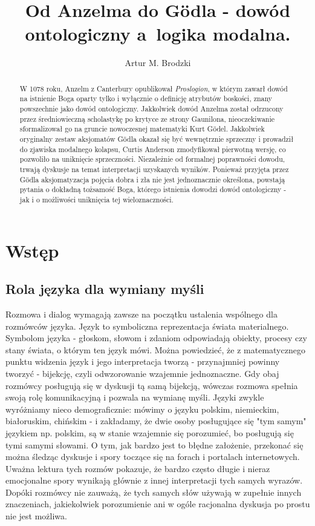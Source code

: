 \documentclass{article}
\title{Od Anzelma do Gödla - dowód ontologiczny a logika modalna.}
\author{Artur M. Brodzki}
\begin{document}
\maketitle

\begin{abstract}
	W 1078 roku, Anzelm z Canterbury opublikował \emph{Proslogion}, w którym zawarł dowód na istnienie Boga oparty tylko i wyłącznie o definicję atrybutów boskości, znany powszechnie jako dowód ontologiczny. Jakkolwiek dowód Anzelma został odrzucony przez średniowieczną scholastykę po krytyce ze strony Gaunilona, nieoczekiwanie sformalizował go na gruncie nowoczesnej matematyki  Kurt Gödel. Jakkolwiek oryginalny zestaw aksjomatów Gödla okazał się być wewnętrznie sprzeczny i prowadził do zjawiska modalnego kolapsu, Curtis Anderson zmodyfikował pierwotną wersję, co pozwoliło na uniknięcie sprzeczności. Niezależnie od formalnej poprawności dowodu, trwają dyskusje na temat interpretacji uzyskanych wyników. Ponieważ przyjęta przez Gödla aksjomatyzacja pojęcia dobra i zła nie jest jednoznacznie określona, powstają pytania o dokładną tożsamość Boga, którego istnienia dowodzi dowód ontologiczny - jak i o możliwości uniknięcia tej wieloznaczności. 
\end{abstract}

\section{Wstęp} \label{sec:intro}

\subsection{Rola języka dla wymiany myśli} \label{sec:language}

Rozmowa i dialog wymagają zawsze na początku ustalenia wspólnego dla rozmówców języka. Język to symboliczna reprezentacja świata materialnego. Symbolom języka - głoskom, słowom i zdaniom odpowiadają obiekty, procesy czy stany świata, o którym ten język mówi. Można powiedzieć, że z matematycznego punktu widzenia język i jego interpretacja tworzą - przynajmniej powinny tworzyć - bijekcję, czyli odwzorowanie wzajemnie jednoznaczne. Gdy obaj rozmówcy posługują się w dyskusji tą samą bijekcją, wówczas rozmowa spełnia swoją rolę komunikacyjną i pozwala na wymianę myśli. Języki zwykle wyróżniamy nieco demograficznie: mówimy o języku polskim, niemieckim, białoruskim, chińskim - i zakładamy, że dwie osoby posługujące się "tym samym" językiem np. polskim, są w stanie wzajemnie się porozumieć, bo posługują się tymi samymi słowami. O tym, jak bardzo jest to błędne założenie, przekonać się można śledząc dyskusje i spory toczące się na forach i portalach internetowych. Uważna lektura tych rozmów pokazuje, że bardzo często długie i nieraz emocjonalne spory wynikają głównie z innej interpretacji tych samych wyrazów. Dopóki rozmówcy nie zauważą, że tych samych słów używają w zupełnie innych znaczeniach, jakiekolwiek porozumienie ani w ogóle racjonalna dyskusja po prostu nie jest możliwa. 
\end{document}
